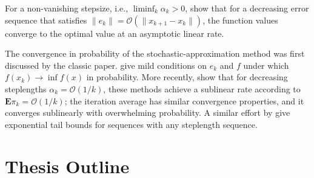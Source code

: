 For a non-vanishing stepsize, i.e., $\liminf_{k}\alpha_k>0$,
\cite{luo1993error} show that for a decreasing error sequence that satisfies
$\|e_{k}\| = \mathcal{O} ( \|x_{k+1}-x_{k}\|)$, the function values converge to the
optimal value at an asymptotic linear rate.

The convergence in probability of the stochastic-approximation method
was first discussed by the classic 
\cite{robbins1951stochastic} paper. \cite{BT:2000} give mild conditions on $e_{k}$ and $f$
under which $f(x_{k}) \to \inf f(x)$ in probability. More recently,
\cite{nemirovski2009robust}
show that for decreasing steplengths $\alpha_k = \mathcal{O}(1/k)$, these
methods achieve a sublinear rate according to $\mathbf{E}\pi_k =
\mathcal{O}(1/k)$; the iteration average has similar convergence
properties, and it converges sublinearly with overwhelming
probability. A similar effort by \cite{nesterov2008confidence}
give exponential tail bounds for sequences with any steplength
sequence.


\section{Thesis Outline}